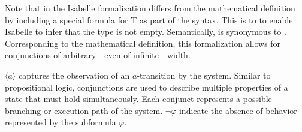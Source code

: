 \begin{isabellebody}
\begin{isamarkuptext}%
Note that in the Isabelle formalization differs from the mathematical definition by including a special formula  for \textsf{T} as part of the syntax. 
This is to to enable Isabelle to infer that the type  is not empty. Semantically,  is synonymous to \isa{{\isasymAnd}{\isacharbraceleft}{\kern0pt}{\isacharbraceright}{\kern0pt}}.
Corresponding to the mathematical definition, this formalization allows for conjunctions of arbitrary - even of infinite - width.%
\end{isamarkuptext}\isamarkuptrue%
%
\begin{isamarkuptext}%
$\langle a \rangle$ captures the observation of an $a$-transition by the system. 
Similar to propositional logic, conjunctions are used to describe multiple properties of a state that must hold simultaneously. Each conjunct represents a possible branching or execution path of the system. 
$\lnot\varphi$ indicate the absence of behavior represented by the subformula $\varphi$. 


\end{isamarkuptext}
\end{isabellebody}

